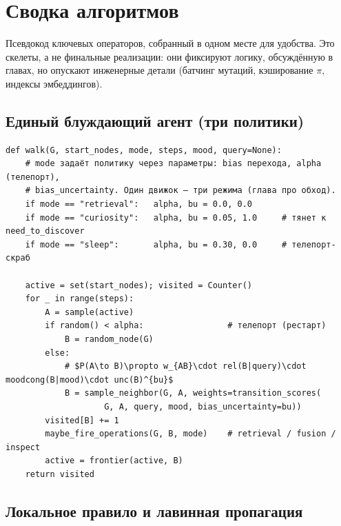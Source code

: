\chapter{Сводка алгоритмов}
\label{ch:algorithms}

Псевдокод ключевых операторов, собранный в одном месте для удобства. Это скелеты,
а не финальные реализации: они фиксируют логику, обсуждённую в главах, но опускают
инженерные детали (батчинг мутаций, кэширование $\pi$, индексы эмбеддингов).

\section{Единый блуждающий агент (три политики)}

\begin{lstlisting}[style=pseudo]
def walk(G, start_nodes, mode, steps, mood, query=None):
    # mode задаёт политику через параметры: bias перехода, alpha (телепорт),
    # bias_uncertainty. Один движок — три режима (глава про обход).
    if mode == "retrieval":   alpha, bu = 0.0, 0.0
    if mode == "curiosity":   alpha, bu = 0.05, 1.0     # тянет к need_to_discover
    if mode == "sleep":       alpha, bu = 0.30, 0.0     # телепорт-скраб

    active = set(start_nodes); visited = Counter()
    for _ in range(steps):
        A = sample(active)
        if random() < alpha:                 # телепорт (рестарт)
            B = random_node(G)
        else:
            # $P(A\to B)\propto w_{AB}\cdot rel(B|query)\cdot moodcong(B|mood)\cdot unc(B)^{bu}$
            B = sample_neighbor(G, A, weights=transition_scores(
                    G, A, query, mood, bias_uncertainty=bu))
        visited[B] += 1
        maybe_fire_operations(G, B, mode)    # retrieval / fusion / inspect
        active = frontier(active, B)
    return visited
\end{lstlisting}

\section{Локальное правило и лавинная пропагация}

